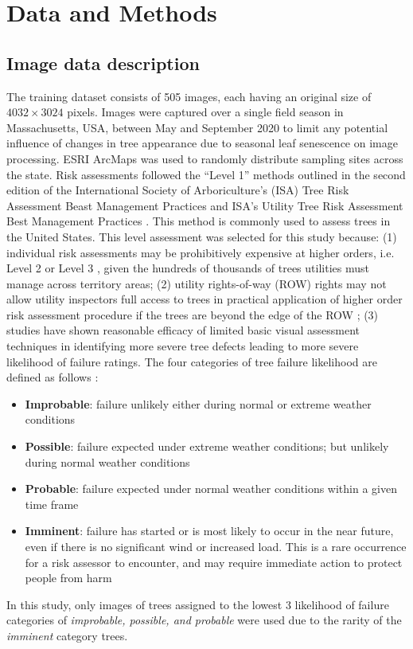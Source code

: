 \documentclass[11pt,twoside]{article}
\numberwithin{equation}{section}
\newcommand{\?}{\stackrel{?}{=}}
\begin{document}
\section{Data and Methods}
\subsection{Image data description}
The training dataset consists of 505 images, each having an original size of $4032\times3024$ pixels.   Images were captured over a single field season in Massachusetts, USA, between May and September 2020 to limit any potential influence of changes in tree appearance due to seasonal leaf senescence on image processing.  ESRI ArcMaps was used to randomly distribute sampling sites across the state.  Risk assessments followed the “Level 1” methods outlined in the second edition of the International Society of Arboriculture’s (ISA) Tree Risk Assessment Beast Management Practices \cite{e.thomassmiley2017best} and ISA’s Utility Tree Risk Assessment Best Management Practices \cite{johnw.goodfellow2020best}.  This method is commonly used to assess trees in the United States.  This level assessment was selected for this study because: (1) individual risk assessments may be prohibitively expensive at higher orders, i.e. Level 2 or Level 3 \cite{e.thomassmiley2017best}, given the hundreds of thousands of trees utilities must manage across territory areas;  (2) utility rights-of-way (ROW) rights may not allow utility inspectors full access to trees in practical application of higher order risk assessment procedure if the trees are beyond the edge of the ROW \cite{johnw.goodfellow2020best}; (3) studies have shown reasonable efficacy of limited basic visual assessment techniques in identifying more severe tree defects \cite{rooney2005reliability,koeser2016frequency} leading to more severe likelihood of failure ratings.  The four categories of tree failure likelihood are defined as follows \cite{e.thomassmiley2017best}:
\begin{itemize}
\item \textbf{Improbable}: failure unlikely either during normal or extreme weather conditions 
\item \textbf{Possible}: failure expected under extreme weather conditions; but unlikely during normal weather conditions
\item \textbf{Probable}: failure expected under normal weather conditions within a given time frame
\item \textbf{Imminent}: failure has started or is most likely to occur in the near future, even if there is no significant wind or increased load. This is a rare occurrence for a risk assessor to encounter, and may require immediate action to protect people from harm
\end{itemize}
	In this study, only images of trees assigned to the lowest 3 likelihood of failure categories of \textit{improbable, possible, \textit{and} probable} were used due to the rarity of the \textit{imminent} category trees.    
\end{document}
